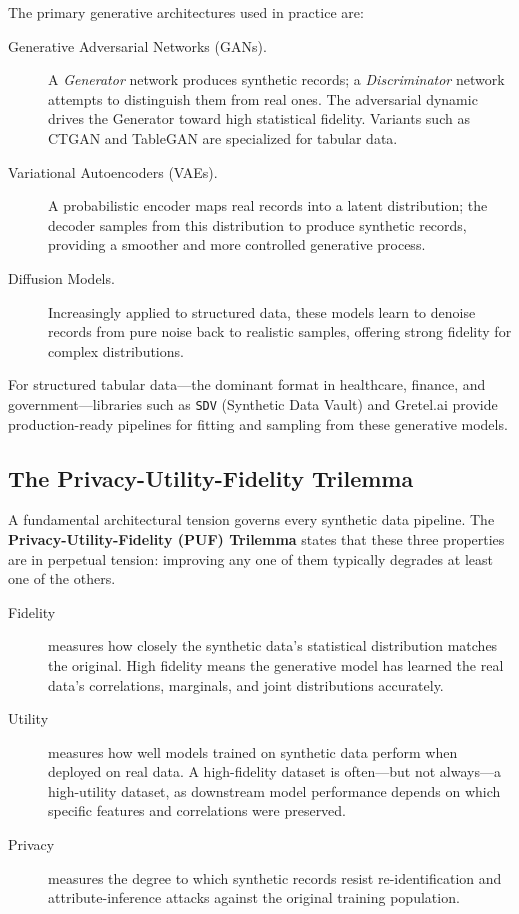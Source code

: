 The primary generative architectures used in practice are:

\begin{description}
  \item[Generative Adversarial Networks (GANs).]
    A \emph{Generator} network produces synthetic records; a
    \emph{Discriminator} network attempts to distinguish them from real
    ones.
    The adversarial dynamic drives the Generator toward high statistical
    fidelity.
    Variants such as CTGAN and TableGAN are specialized for tabular
    data.

  \item[Variational Autoencoders (VAEs).]
    A probabilistic encoder maps real records into a latent
    distribution; the decoder samples from this distribution to produce
    synthetic records, providing a smoother and more controlled
    generative process.

  \item[Diffusion Models.]
    Increasingly applied to structured data, these models learn to
    denoise records from pure noise back to realistic samples, offering
    strong fidelity for complex distributions.
\end{description}

For structured tabular data---the dominant format in healthcare,
finance, and government---libraries such as \texttt{SDV} (Synthetic
Data Vault) and Gretel.ai provide production-ready pipelines for
fitting and sampling from these generative models.

\subsection{The Privacy-Utility-Fidelity Trilemma}
\label{subsec:puf-trilemma}

A fundamental architectural tension governs every synthetic data
pipeline.
The \textbf{Privacy-Utility-Fidelity (PUF) Trilemma} states that
these three properties are in perpetual tension: improving any one of
them typically degrades at least one of the others.

\begin{description}
  \item[Fidelity] measures how closely the synthetic data's statistical
    distribution matches the original.
    High fidelity means the generative model has learned the real
    data's correlations, marginals, and joint distributions accurately.

  \item[Utility] measures how well models trained on synthetic data
    perform when deployed on real data.
    A high-fidelity dataset is often---but not always---a high-utility
    dataset, as downstream model performance depends on which specific
    features and correlations were preserved.

  \item[Privacy] measures the degree to which synthetic records resist
    re-identification and attribute-inference attacks against the
    original training population.
\end{description}

